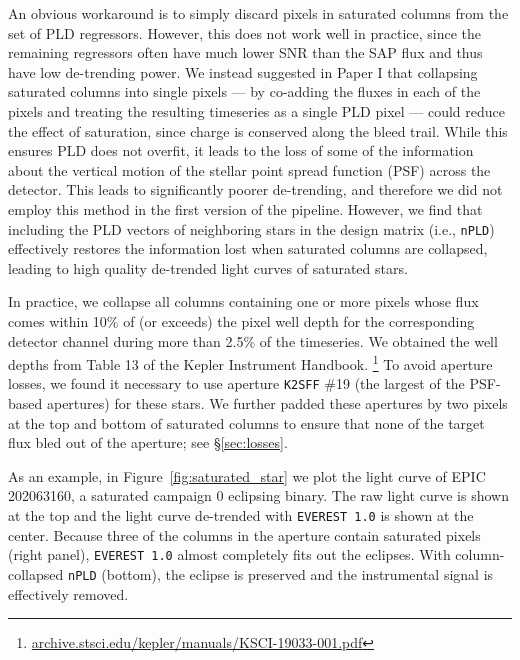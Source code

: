 \documentclass[]{aastex62}
\begin{document}
An obvious workaround is to simply discard pixels in saturated columns from the set of PLD
regressors. However, this does not work well in practice, since the remaining regressors
often have much lower SNR than the SAP flux and thus have low de-trending power.
We instead suggested in Paper I that collapsing saturated columns into single pixels --- by co-adding
the fluxes in each of the pixels and treating the resulting timeseries as a single PLD pixel ---
could reduce the effect of saturation, since charge is conserved along the bleed trail. While
this ensures PLD does not overfit, it leads to the loss of some of the information about the
vertical motion of the stellar point spread function (PSF) across the detector. This leads to significantly poorer
de-trending, and therefore we did not employ this method in the first version of the pipeline.
However, we find that including the PLD vectors of neighboring stars in the design matrix
(i.e., \texttt{nPLD}) effectively restores the information lost when saturated columns are
collapsed, leading to high quality de-trended light curves of saturated stars.

In practice, we collapse all columns containing one or more pixels whose flux
comes within 10\% of (or exceeds)
the pixel well depth for the corresponding detector channel during more than 2.5\% of the
timeseries. We obtained the well depths from
Table 13 of the Kepler Instrument Handbook.
\footnote{\url{archive.stsci.edu/kepler/manuals/KSCI-19033-001.pdf}} To avoid aperture
losses, we found it necessary to use aperture \texttt{K2SFF} \#19 (the largest of the PSF-based
apertures) for these stars. We further padded these apertures by two pixels at the top
and bottom of saturated columns to ensure that none of the target flux bled out of the
aperture; see \S\ref{sec:losses}.

As an example, in Figure~\ref{fig:saturated_star} we plot the light curve of EPIC 202063160, a saturated
campaign 0 eclipsing binary. The raw light curve is shown at the top and the light curve
de-trended with \texttt{EVEREST 1.0} is shown at the center. Because three of the columns
in the aperture contain saturated pixels (right panel), \texttt{EVEREST 1.0} almost
completely fits out the eclipses. With column-collapsed \texttt{nPLD} (bottom), the
eclipse is preserved and the instrumental signal is effectively removed.
\end{document}
